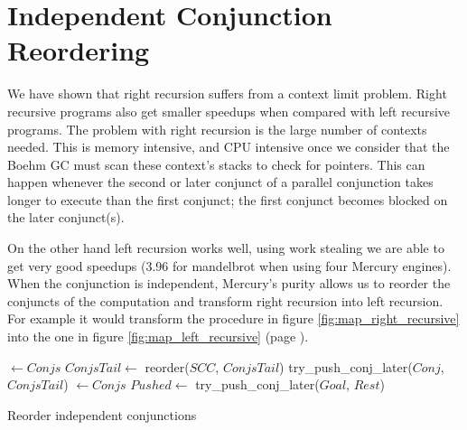 
\section{Independent Conjunction Reordering}
\label{sec:rts_reorder}

We have shown that right recursion suffers from a context limit problem.
Right recursive programs also get smaller speedups when compared with left
recursive programs.
The problem with right recursion is the large number of contexts needed.
This is memory intensive, and CPU intensive once we consider that
the Boehm GC must scan these context's stacks to check for pointers.
This can happen whenever the second or later
conjunct of a parallel conjunction
takes longer to execute than the first conjunct;
the first conjunct becomes blocked on the later conjunct(s).

On the other hand left recursion works well,
using work stealing we are able to get very good speedups (3.96 for
mandelbrot when using four Mercury engines).
When the conjunction is independent,
Mercury's purity allows us to reorder the conjuncts of the computation and
transform right recursion into left recursion.
For example it would transform the procedure in figure
\ref{fig:map_right_recursive} into the one in figure
\ref{fig:map_left_recursive} (page \pageref{fig:map_right_recursive}).

\begin{algorithm}
\begin{algorithmic}[1]
        \State \Return \nil
    \Else
        \State {} $\gets Conjs$
        \State $ConjsTail \gets$ reorder($SCC$, $ConjsTail$)
            \State \Return {}
        \Else
            \State \Return try\_push\_conj\_later($Conj$, $ConjsTail$)
        \EndIf
    \EndIf
\EndProcedure
{}
        \State \Return {}
    \Else
        \State {} $\gets Conjs$
            \State $Pushed \gets$ try\_push\_conj\_later($Goal$, $Rest$)
            \State \Return {}
        \Else
            \State \Return {}
        \EndIf
    \EndIf
\EndProcedure
\end{algorithmic}
\caption{Reorder independent conjunctions}
\label{alg:reorder_conjunction}
\end{algorithm}

